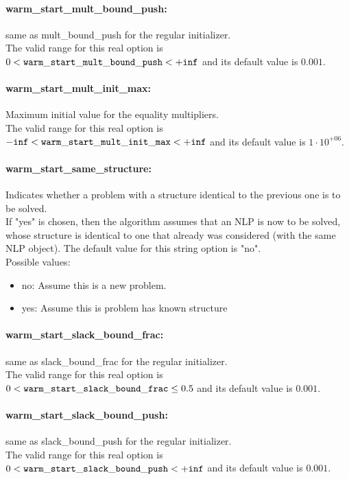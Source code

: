 \paragraph{warm\_start\_mult\_bound\_push:}\label{opt:warm_start_mult_bound_push} same as mult\_bound\_push for the regular initializer. \\
 The valid range for this real option is 
$0 <  {\tt warm\_start\_mult\_bound\_push } <  {\tt +inf}$
and its default value is $0.001$.


\paragraph{warm\_start\_mult\_init\_max:}\label{opt:warm_start_mult_init_max} Maximum initial value for the equality multipliers. \\
 The valid range for this real option is 
${\tt -inf} <  {\tt warm\_start\_mult\_init\_max } <  {\tt +inf}$
and its default value is $1 \cdot 10^{+06}$.


\paragraph{warm\_start\_same\_structure:}\label{opt:warm_start_same_structure} Indicates whether a problem with a structure identical to the previous one is to be solved. \\
 If "yes" is chosen, then the algorithm assumes that an NLP is now to be solved, whose structure is identical to one that already was considered (with the same NLP object). The default value for this string option is "no".
\\ 
Possible values:
\begin{itemize}
   \item no: Assume this is a new problem.
   \item yes: Assume this is problem has known structure
\end{itemize}

\paragraph{warm\_start\_slack\_bound\_frac:}\label{opt:warm_start_slack_bound_frac} same as slack\_bound\_frac for the regular initializer. \\
 The valid range for this real option is 
$0 <  {\tt warm\_start\_slack\_bound\_frac } \le 0.5$
and its default value is $0.001$.


\paragraph{warm\_start\_slack\_bound\_push:}\label{opt:warm_start_slack_bound_push} same as slack\_bound\_push for the regular initializer. \\
 The valid range for this real option is 
$0 <  {\tt warm\_start\_slack\_bound\_push } <  {\tt +inf}$
and its default value is $0.001$.


